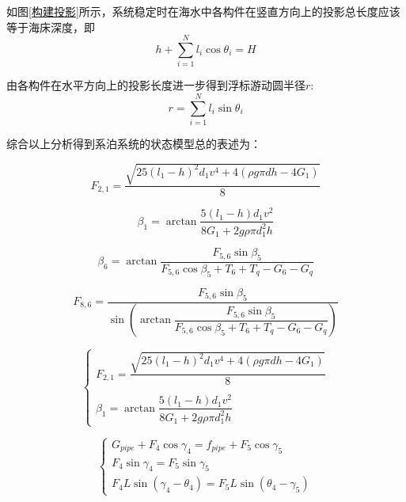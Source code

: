 \documentclass{article}
\numberwithin{equation}{subsection}
\begin{document}
如图\ref{构建投影}所示，系统稳定时在海水中各构件在竖直方向上的投影总长度应该等于海床深度，即
\begin{equation}
    h+\sum_{i=1}^{N}l_{i}\cos\theta_{i}=H
\end{equation}

由各构件在水平方向上的投影长度进一步得到浮标游动圆半径$r$:
\begin{equation}
r=\sum_{i=1}^{N}l_{i}\sin\theta_{i}
\end{equation}

综合以上分析得到系泊系统的状态模型总的表述为：

\begin{equation}
F_{2,1}=\dfrac{\sqrt{25(l_{1}-h)^{2}d_{1}v^{4}+4(\rho g\pi dh-4G_{1})}}{8}
\end{equation}

\begin{equation}
\beta_{1}=\arctan\dfrac{5(l_{1}-h)d_{1}v^{2}}{8G_{1}+2g\rho\pi d_{1}^{2}h}
\end{equation}

\begin{equation}
\beta_{6}=\arctan\frac{F_{5,6}\sin\beta_{5}}{F_{5,6}\cos\beta_{5}+T_{6}+T_{q}-G_{6}-G_{q}}
\end{equation}

\begin{equation}
F_{8,6}=\frac{F_{5,6}\sin\beta_{5}}{\sin(\arctan\dfrac{F_{5,6}\sin\beta_{5}}{F_{5,6}\cos\beta_{5}+T_{6}+T_{q}-G_{6}-G_{q}})}
\end{equation}

\begin{equation}\left\{\begin{array}{l}
F_{2,1}=\dfrac{\sqrt{25\left(l_{1}-h\right)^{2} d_{1} v^{4}+4\left(\rho g \pi d h-4 G_{1}\right)}}{8} \\
\quad \\
\beta_{1}=\arctan \dfrac{5\left(l_{1}-h\right) d_{1} v^{2}}{8 G_{1}+2 g \rho \pi d_{1}^{2} h}
\end{array}\right.\end{equation}

\begin{equation}\left\{\begin{array}{l}
G_{p i p e}+F_{4} \cos \gamma_{4}=f_{p i p e}+F_{5} \cos \gamma_{5} \\
F_{4} \sin \gamma_{4}=F_{5} \sin \gamma_{5} \\
F_{4} L \sin \left(\gamma_{4}-\theta_{4}\right)=F_{5} L \sin \left(\theta_{4}-\gamma_{5}\right)
\end{array}\right.\end{equation}
\end{document}
